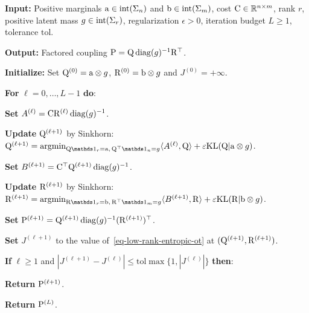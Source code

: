 \begin{algH}\label{alg-low-rank-sinkhorn-fixed-g}
\textbf{Input:} Positive marginals $\a\in\operatorname{int}(\simplex_n)$ and $\b\in\operatorname{int}(\simplex_m)$, cost $\C\in\RR^{n\times m}$, rank $r$, positive latent mass $g\in\operatorname{int}(\simplex_r)$, regularization $\epsilon>0$, iteration budget $L\geq1$, tolerance $\mathrm{tol}$.

\textbf{Output:} Factored coupling $\P=\Q\diag(g)^{-1}\R^\top$.

\textbf{Initialize:} Set $\Q^{(0)}=\a\otimes g$, $\R^{(0)}=\b\otimes g$ and $J^{(0)}=+\infty$.

\textbf{For} $\ell=0,\ldots,L-1$ \textbf{do}:
\begin{algblock}
\textbf{Set} $A^{(\ell)}=\C \R^{(\ell)}\diag(g)^{-1}$.

\textbf{Update} $\Q^{(\ell+1)}$ by Sinkhorn:
\(\Q^{(\ell+1)}=\argmin_{\Q\ones_r=\a,\,\Q^\top\ones_n=g}\langle A^{(\ell)},\Q\rangle+\epsilon\KLD(\Q|\a\otimes g)\).

\textbf{Set} $B^{(\ell+1)}=\C^\top \Q^{(\ell+1)}\diag(g)^{-1}$.

\textbf{Update} $\R^{(\ell+1)}$ by Sinkhorn:
\(\R^{(\ell+1)}=\argmin_{\R\ones_r=\b,\,\R^\top\ones_m=g}\langle B^{(\ell+1)},\R\rangle+\epsilon\KLD(\R|\b\otimes g)\).

\textbf{Set} $\P^{(\ell+1)}=\Q^{(\ell+1)}\diag(g)^{-1}(\R^{(\ell+1)})^\top$.

\textbf{Set} $J^{(\ell+1)}$ to the value of~\eqref{eq-low-rank-entropic-ot} at $(\Q^{(\ell+1)},\R^{(\ell+1)})$.

\textbf{If} $\ell\geq1$ and $|J^{(\ell+1)}-J^{(\ell)}|\leq \mathrm{tol}\max\{1,|J^{(\ell)}|\}$ \textbf{then}:
\begin{algblock}
\textbf{Return} $\P^{(\ell+1)}$.
\end{algblock}
\end{algblock}

\textbf{Return} $\P^{(L)}$.
\end{algH}

